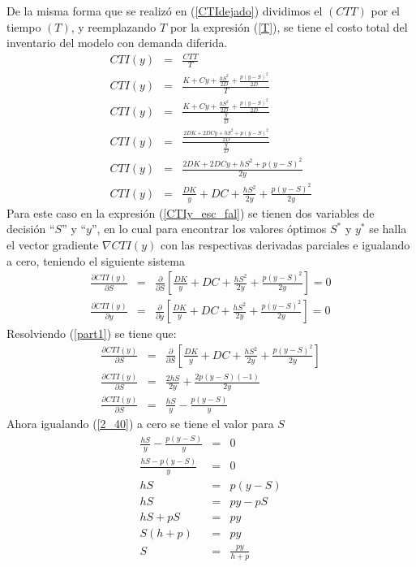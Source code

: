 De la misma forma que se realizó en (\ref{CTIdejado}) dividimos el $(CTT)$ por el tiempo $(T)$, y reemplazando $T$ por la expresión (\ref{T}), se tiene el costo total del inventario del modelo con demanda diferida.
\begin{eqnarray}
	\label{CTIy_esc_fal}
	CTI(y) &=& \frac{CTT}{T} \nonumber \\
	CTI(y) &=& \frac{K + Cy + \frac{hS^2}{2D} + \frac{p{(y-S)}^{2}}{2D}}{T} \nonumber \\
	CTI(y) &=& \frac{K + Cy + \frac{hS^2}{2D} + \frac{p{(y-S)}^{2}}{2D}}{\frac{y}{D}} \nonumber \\
	CTI(y) &=& \frac{\frac{2DK + 2DCy + hS^2 + p{(y-S)}^{2}}{2D}}{\frac{y}{D}} \nonumber \\
	CTI(y) &=& \frac{2DK + 2DCy + hS^2 + p{(y-S)}^{2}}{2y} \nonumber \\
	CTI(y) &=& \frac{DK}{y} + DC + \frac{hS^2}{2y}+\frac{p{(y-S)}^{2}}{2y}
\end{eqnarray}
Para este caso en la expresión (\ref{CTIy_esc_fal}) se tienen dos variables de decisión ``$S$'' y ``$y$'', en lo cual para encontrar los valores óptimos $S^*$ y $y^*$ se halla el vector gradiente $\nabla CTI(y)$ con las respectivas derivadas parciales e igualando a cero, teniendo el siguiente sistema
\begin{eqnarray}
	\label{part1}
	\frac{\partial CTI(y)}{\partial S} &=& \frac{\partial}{\partial S} \left[ \frac{DK}{y} + DC + \frac{hS^2}{2y}+\frac{p{(y-S)}^{2}}{2y} \right] = 0 \\
	\label{part2}
	\frac{\partial CTI(y)}{\partial y} &=& \frac{\partial}{\partial y} \left[ \frac{DK}{y} + DC + \frac{hS^2}{2y}+\frac{p{(y-S)}^{2}}{2y} \right] = 0
\end{eqnarray}
Resolviendo (\ref{part1}) se tiene que:
\begin{eqnarray}
	\label{2_40}
	\frac{\partial CTI(y)}{\partial S} &=& \frac{\partial}{\partial S} \left[ \frac{DK}{y} + DC + \frac{hS^2}{2y}+\frac{p{(y-S)}^{2}}{2y} \right] \nonumber \\
	\frac{\partial CTI(y)}{\partial S} &=& \frac{2hS}{2y} + \frac{2p(y-S)(-1)}{2y} \nonumber \\
	\frac{\partial CTI(y)}{\partial S} &=& \frac{hS}{y} - \frac{p(y-S)}{y}
\end{eqnarray}
Ahora igualando (\ref{2_40}) a cero se tiene el valor para $S$ 
\begin{eqnarray}
	\label{S_240}
	\frac{hS}{y} - \frac{p(y-S)}{y} &=& 0 \nonumber \\
	\frac{hS - p (y-S)}{y} &=& 0 \nonumber \\
	hS &=& p(y-S) \nonumber \\
	hS &=& py - pS \nonumber \\
	hS + pS &=& py \nonumber \\
	S(h+p) &=& py \nonumber \\
	S &=& \frac{py}{h+p}
\end{eqnarray}
